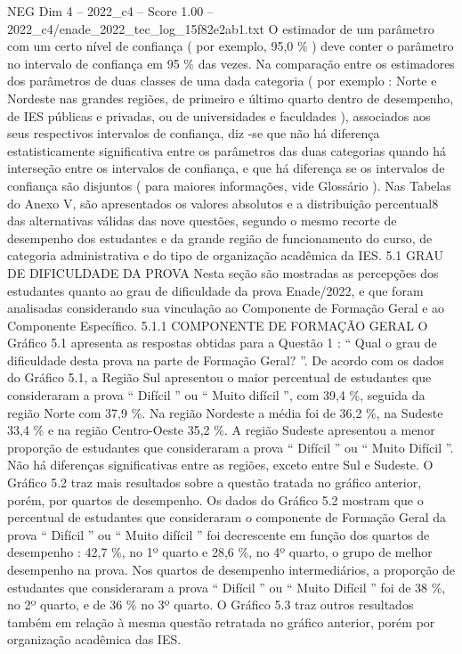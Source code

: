 \begin{textsample}{NEG Dim 4 – 2022\_c4 – Score 1.00 – 2022\_c4/enade\_2022\_tec\_log\_15f82e2ab1.txt}
O estimador de um parâmetro com um certo nível de confiança ( por exemplo, 95,0 \% ) deve conter o parâmetro no intervalo de confiança em 95 \% das vezes.
Na comparação entre os estimadores dos parâmetros de duas classes de uma dada categoria ( por exemplo : Norte e Nordeste nas grandes regiões, de primeiro e último quarto dentro de desempenho, de IES públicas e privadas, ou de universidades e faculdades ), associados aos seus respectivos intervalos de confiança, diz -se que não há diferença estatisticamente significativa entre os parâmetros das duas categorias quando há interseção entre os intervalos de confiança, e que há diferença se os intervalos de confiança são disjuntos ( para maiores informações, vide Glossário ).
Nas Tabelas do Anexo V, são apresentados os valores absolutos e a distribuição percentual8 das alternativas válidas das nove questões, segundo o mesmo recorte de desempenho dos estudantes e da grande região de funcionamento do curso, de categoria administrativa e do tipo de organização acadêmica da IES. 5.1 GRAU DE DIFICULDADE DA PROVA Nesta seção são mostradas as percepções dos estudantes quanto ao grau de dificuldade da prova Enade/2022, e que foram analisadas considerando sua vinculação ao Componente de Formação Geral e ao Componente Específico. 5.1.1 COMPONENTE DE FORMAÇÃO GERAL O Gráfico 5.1 apresenta as respostas obtidas para a Questão 1 : “ Qual o grau de dificuldade desta prova na parte de Formação Geral? ”.
De acordo com os dados do Gráfico 5.1, a Região Sul apresentou o maior percentual de estudantes que consideraram a prova “ Difícil ” ou “ Muito difícil ”, com 39,4 \%, seguida da região Norte com 37,9 \%.
Na região Nordeste a média foi de 36,2 \%, na Sudeste 33,4 \% e na região Centro-Oeste 35,2 \%.
A região Sudeste apresentou a menor proporção de estudantes que consideraram a prova “ Difícil ” ou “ Muito Difícil ”.
Não há diferenças significativas entre as regiões, exceto entre Sul e Sudeste.
O Gráfico 5.2 traz mais resultados sobre a questão tratada no gráfico anterior, porém, por quartos de desempenho.
Os dados do Gráfico 5.2 mostram que o percentual de estudantes que consideraram o componente de Formação Geral da prova “ Difícil ” ou “ Muito difícil ” foi decrescente em função dos quartos de desempenho : 42,7 \%, no 1º quarto e 28,6 \%, no 4º quarto, o grupo de melhor desempenho na prova.
Nos quartos de desempenho intermediários, a proporção de estudantes que consideraram a prova “ Difícil ” ou “ Muito Difícil ” foi de 38 \%, no 2º quarto, e de 36 \% no 3º quarto.
O Gráfico 5.3 traz outros resultados também em relação à mesma questão retratada no gráfico anterior, porém por organização acadêmica das IES.

\end{textsample}
